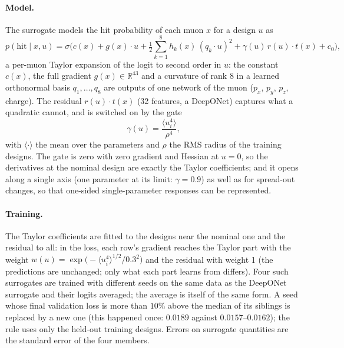 \documentclass[11pt,a4paper]{article}
\begin{document}
\paragraph{Model.}
The surrogate models the hit probability of each muon $x$ for a design $u$ as
\begin{equation}
  p(\text{hit}\mid x,u) = \sigma\!\Big(c(x) + g(x)\cdot u + \tfrac12\textstyle\sum_{k=1}^{8} h_k(x)\,(q_k\cdot u)^2
  + \gamma(u)\, r(u)\cdot t(x) + c_0\Big),
\end{equation}
a per-muon Taylor expansion of the logit to second order in $u$: the constant $c(x)$, the full
gradient $g(x)\in\mathbb{R}^{43}$ and a curvature of rank 8 in a learned orthonormal basis
$q_1,\dots,q_8$ are outputs of one network of the muon ($p_x$, $p_y$, $p_z$, charge). The residual
$r(u)\cdot t(x)$ (32 features, a DeepONet) captures what a quadratic cannot, and is switched on
by the gate
\begin{equation}
  \gamma(u) = \frac{\langle u_i^4\rangle}{\rho^4},
\end{equation}
with $\langle\cdot\rangle$ the mean over the parameters and $\rho$ the RMS radius of the training
designs. The gate is zero with zero gradient and Hessian at $u=0$, so the derivatives at the
nominal design are exactly the Taylor coefficients; and it opens along a single axis (one
parameter at its limit: $\gamma=0.9$) as well as for spread-out changes, so that one-sided
single-parameter responses can be represented.

\paragraph{Training.}
The Taylor coefficients are fitted to the designs near the nominal one and the residual to all:
in the loss, each row's gradient reaches the Taylor part with the weight
$w(u)=\exp\!\big(-\langle u_i^4\rangle^{1/2}/0.3^2\big)$ and the residual with weight 1 (the
predictions are unchanged; only what each part learns from differs). Four such surrogates are
trained with different seeds on the same data as the DeepONet surrogate and their logits
averaged; the average is itself of the same form. A seed whose final validation loss is more
than $10\%$ above the median of its siblings is replaced by a new one (this happened once:
$0.0189$ against $0.0157$--$0.0162$); the rule uses only the held-out training designs. Errors on
surrogate quantities are the standard error of the four members.
\end{document}
